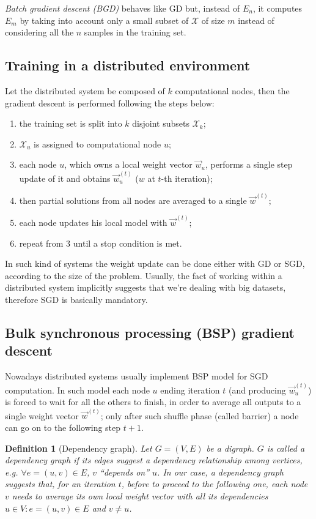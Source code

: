 \documentclass[a4paper,12pt]{article}
\theoremstyle{newplanestyle}
\theoremstyle{newdefinitionstyle}
\newtheorem*{newdef*}{Definition}
\theoremstyle{newprovestyle}
\begin{document}
\textit{Batch gradient descent (BGD)} behaves like GD but, instead of $E_n$, it computes $E_m$ by taking into account only a small subset of $\mathcal{X}$ of size $m$ instead of considering all the $n$ samples in the training set.

\subsection*{Training in a distributed environment}
Let the distributed system be composed of $k$ computational nodes, then the gradient descent is performed following the steps below:
\begin{enumerate}
\item the training set is split into $k$ disjoint subsets $\mathcal{X}_k$;
\item $\mathcal{X}_u$ is assigned to computational node $u$;
\item each node $u$, which owns a local weight vector $\vec{w}_u$, performs a single step update of it and obtains $\vec{w}^{(t)}_u$ ($w$ at $t$-th iteration);
\item then partial solutions from all nodes are averaged to a single $\vec{w}^{(t)}$;
\item each node updates his local model with $\vec{w}^{(t)}$;
\item repeat from 3 until a stop condition is met.
\end{enumerate}
In such kind of systems the weight update can be done either with GD or SGD, according to the size of the problem. Usually, the fact of working within a distributed system implicitly suggests that we're dealing with big datasets, therefore SGD is basically mandatory.


\subsection*{Bulk synchronous processing (BSP) gradient descent}
Nowadays distributed systems usually implement BSP model for SGD computation. In such model each node $u$ ending iteration $t$ (and producing $\vec{w}^{(t)}_u$) is forced to wait for all the others to finish, in order to average all outputs to a single weight vector $\vec{w}^{(t)}$; only after such shuffle phase (called barrier) a node can go on to the following step $t+1$.

\begin{newdef*}[Dependency graph]
Let $G=(V,E)$ be a digraph. $G$ is called a \textit{dependency graph} if its edges suggest a dependency relationship among vertices, e.g. $\forall e=(u,v) \in E$, $v$ ``depends on'' $u$. In our case, a dependency graph suggests that, for an iteration $t$, before to proceed to the following one, each node $v$ needs to average its own local weight vector with all its dependencies $u \in V : e=(u,v) \in E$ and $v \neq u$.
\end{newdef*}
\end{document}
